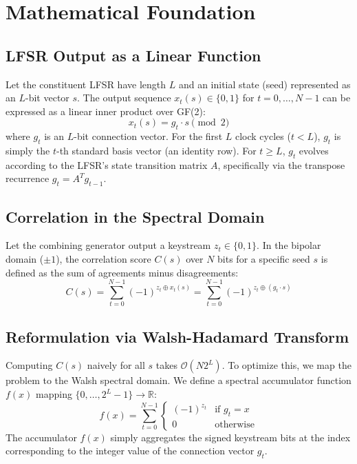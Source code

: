 \section{Mathematical Foundation}
\label{sec:math_foundation}

\subsection{LFSR Output as a Linear Function}
Let the constituent LFSR have length $L$ and an initial state (seed) represented as an $L$-bit vector $s$. The output sequence $x_t(s) \in \{0, 1\}$ for $t = 0, \dots, N-1$ can be expressed as a linear inner product over GF(2):
\begin{equation}
    x_t(s) = g_t \cdot s \pmod 2
\end{equation}
where $g_t$ is an $L$-bit connection vector. 
For the first $L$ clock cycles ($t < L$), $g_t$ is simply the $t$-th standard basis vector (an identity row). For $t \geq L$, $g_t$ evolves according to the LFSR's state transition matrix $A$, specifically via the transpose recurrence $g_t = A^T g_{t-1}$. 

\subsection{Correlation in the Spectral Domain}
Let the combining generator output a keystream $z_t \in \{0, 1\}$. In the bipolar domain ($\pm 1$), the correlation score $C(s)$ over $N$ bits for a specific seed $s$ is defined as the sum of agreements minus disagreements:
\begin{equation}
    C(s) = \sum_{t=0}^{N-1} (-1)^{z_t \oplus x_t(s)} = \sum_{t=0}^{N-1} (-1)^{z_t \oplus (g_t \cdot s)}
\end{equation}

\subsection{Reformulation via Walsh-Hadamard Transform}
Computing $C(s)$ naively for all $s$ takes $\mathcal{O}(N 2^L)$. To optimize this, we map the problem to the Walsh spectral domain. We define a spectral accumulator function $f(x)$ mapping $\{0, \dots, 2^L-1\} \to \mathbb{R}$:
\begin{equation}
    f(x) = \sum_{t=0}^{N-1} \begin{cases} 
      (-1)^{z_t} & \text{if } g_t = x \\
      0 & \text{otherwise}
   \end{cases}
\end{equation}
The accumulator $f(x)$ simply aggregates the signed keystream bits at the index corresponding to the integer value of the connection vector $g_t$. 

